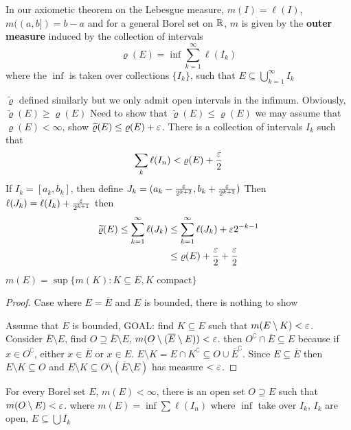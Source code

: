 \begin{definition}
  In our axiometic theorem on the Lebesgue measure, $m(I) = \ell(I)$, $m((a, b]) = b-a$
  and for a general Borel set on $\mathbb R$, $m$ is given by the \textbf{outer measure} induced by the collection of intervals
  \[\varrho(E) = \inf \sum_{k=1}^\infty \ell(I_k)\]
  where the $\inf$ is taken over collections $\{I_k\}$, such that $E \subseteq \bigcup_{k=1}^\infty I_k$
\end{definition}

\begin{remark}
  $\widetilde{\varrho}$ defined similarly but we only admit open intervals in the infimum.
  Obviously, $\widetilde{\varrho}(E) \ge \varrho(E)$
  Need to show that $\widetilde{\varrho}(E)\le \varrho(E)$
  we may assume that $\varrho(E) < \infty$, show $\widetilde{\varrho}(E) \le \varrho(E) + \varepsilon$.
  There is a collection of intervals $I_k$ such that
  \[\sum_k \ell(I_n) < \varrho(E) + \frac{\varepsilon}2\]
  If $I_k = [a_k, b_k]$, then define $J_k = (a_k - \frac{\varepsilon}{2^{k+2}}, b_k + \frac{\varepsilon}{2^{k+2}})$
  Then $\ell(J_k) = \ell(I_k) + \frac{\varepsilon}{2^{k+1}}$ then
  \begin{align*}
    \widetilde{\varrho}(E) \le \sum_{k=1}^\infty \ell(J_k) &\le \sum_{k=1}^\infty \ell(J_k) + \varepsilon2^{-k-1} \\
    &\le \varrho(E) + \frac{\varepsilon}2 + \frac{\varepsilon}2
  \end{align*}

\end{remark}



\begin{lemma}
  $m(E) = \sup\{m(K) : K \subseteq E, K \text{ compact}\}$
\end{lemma}

\begin{proof}
  Case where $E = \overline{E}$ and $E$ is bounded, there is nothing to show

  Assume that $E$ is bounded, GOAL: find $K \subseteq E$ such that $m(E\setminus K) < \varepsilon$.
  Consider $\overline{E} \setminus E$, find $O \supseteq \overline{E} \setminus E$, $m(O\setminus (\overline{E} \setminus E)) < \varepsilon$.
  then $O^\complement \cap \overline{E} \subseteq E$ because if $x \in O^\complement$, either $x \in \overline{E}$ or $x \in E$.
  $E \setminus K = E \cap K^\complement \subseteq O \cup \overline{E}^\complement$.
  Since $E \subseteq \overline{E}$ then $E\setminus K \subseteq O$ and $E\setminus K \subseteq O \setminus (\overline{E} \setminus{E})$ 
  has measure $< \varepsilon$.
\end{proof}
\begin{theorem}
  For every Borel set $E$, $m(E) < \infty$, there is an open set $O\supseteq E$ such that $m(O\setminus E) < \varepsilon$.
  where $m(E) = \inf \sum \ell(I_n)$ where $\inf$ take over $I_k$, $I_k$ are open, $E \subseteq \bigcup I_k$
\end{theorem}

